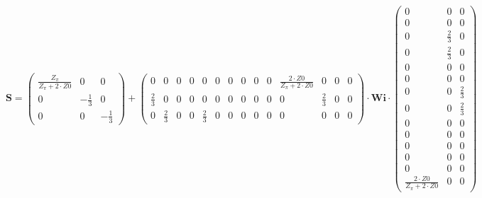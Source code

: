 \[ \mathbf{S} = \left(\begin{smallmatrix}
\frac{Z_{\pi}}{Z_{\pi}+2\cdot Z0} & 0 & 0 \\ 0 & -\frac{1}{3} & 0 \\ 0
& 0 & -\frac{1}{3} \end{smallmatrix}\right) +
\left(\begin{smallmatrix} 0 & 0 & 0 & 0 & 0 & 0 & 0 & 0 & 0 & 0 &
\frac{2\cdot Z0}{Z_{\pi}+2\cdot Z0} & 0 & 0 & 0 \\ \frac{2}{3} & 0 & 0
& 0 & 0 & 0 & 0 & 0 & 0 & 0 & 0 & \frac{2}{3} & 0 & 0 \\ 0 &
\frac{2}{3} & 0 & 0 & \frac{2}{3} & 0 & 0 & 0 & 0 & 0 & 0 & 0 & 0 & 0
\end{smallmatrix}\right) \cdot \mathbf{Wi}
\cdot\left(\begin{smallmatrix} 0 & 0 & 0 \\ 0 & 0 & 0 \\ 0 &
\frac{2}{3} & 0 \\ 0 & \frac{2}{3} & 0 \\ 0 & 0 & 0 \\ 0 & 0 & 0 \\ 0
& 0 & \frac{2}{3} \\ 0 & 0 & \frac{2}{3} \\ 0 & 0 & 0 \\ 0 & 0 & 0 \\
0 & 0 & 0 \\ 0 & 0 & 0 \\ 0 & 0 & 0 \\ \frac{2\cdot Z0}{Z_{\pi}+2\cdot
Z0} & 0 & 0 \end{smallmatrix}\right) \]
